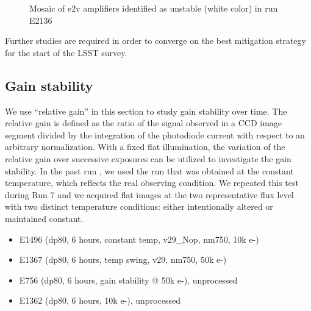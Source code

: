 \begin{figure}[htbp]
\begin{minipage}{0.45\textwidth}
    \caption{Mosaic of e2v amplifiers identified as unstable (white color) in run E2136}
    \label{fig:stability_mosaic}
\end{minipage}
\end{figure}

%

Further studies are required in order to converge on the best mitigation
strategy for the start of the LSST survey.

\subsection{Gain stability}\label{sec:gain-stability-2}
We use ``relative gain'' in this section to study gain stability over time. 
The relative gain is defined as the ratio of the signal observed in a CCD image segment divided by the integration of the photodiode current with respect to an arbitrary normalization.
With a fixed flat illumination, the variation of the relative gain over successive exposures can be utilized to investigate the gain stability. 
In the past run \citep{2024SPIE13103E..0WU}, we used the run that was obtained at the constant temperature, which reflects the real observing condition. We repeated this test during Run 7 and we acquired flat images at the two representative flux level with two distinct temperature conditions: either intentionally altered or maintained constant.
\begin{itemize}
    \item E1496 (dp80, 6 hours, constant temp, v29\_Nop, nm750, 10k e-)
    \item E1367 (dp80, 6 hours, temp swing, v29, nm750, 50k e-)
    \item E756 (dp80, 6 hours, gain stability @ 50k e-), unprocessed
    \item E1362 (dp80, 6 hours, 10k e-), unprocessed
\end{itemize}

